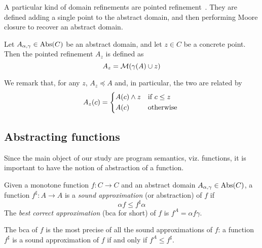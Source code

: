 A particular kind of domain refinements are pointed refinement~\cite{BGGR22}. They are defined adding a single point to the abstract domain, and then performing Moore closure to recover an abstract domain.
\begin{definition}
	Let $A_{\alpha, \gamma} \in \text{\normalfont Abs}(C)$ be an abstract domain, and let $z \in C$ be a concrete point. Then the pointed refinement $A_z$ is defined as
	\[
	A_z = \mathcal{M}(\gamma(A) \cup z)
	\]
\end{definition}
We remark that, for any $z$, $A_z \preceq A$ and, in particular, the two are related by
\[
A_z(c) = \begin{cases*}
	A(c) \wedge z & if $c \le z$ \\
	A(c)          & otherwise
\end{cases*}
\]

\subsection{Abstracting functions}
Since the main object of our study are program semantics, viz. functions, it is important to have the notion of abstraction of a function.
\begin{definition}
	Given a monotone function $f : C \rightarrow C$ and an abstract domain $A_{\alpha, \gamma} \in \text{\normalfont Abs}(C)$, a function $f^{\sharp} : A \rightarrow A$ is a \emph{sound approximation} (or abstraction) of $f$ if
	\[
	\alpha f \le f^{\sharp} \alpha
	\]
	The \emph{best correct approximation} (bca for short) of $f$ is $f^{A} = \alpha f \gamma$.
\end{definition}
The bca of $f$ is the most precise of all the sound approximations of $f$: a function $f^{\sharp}$ is a sound approximation of $f$ if and only if $f^{A} \le f^{\sharp}$.

